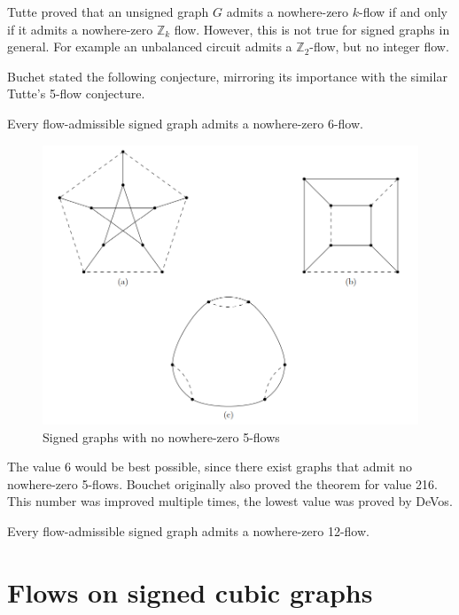 Tutte\cite{tutte-proof} proved that an unsigned graph $G$ admits a nowhere-zero $k$-flow if and only if it admits a nowhere-zero $\mathbb{Z}_k$ flow.
However, this is not true for signed graphs in general. For example an unbalanced circuit admits a $\mathbb{Z}_2$-flow, but no integer flow.

Buchet stated the following conjecture, mirroring its importance with the similar Tutte's 5-flow conjecture.

\begin{conjecture}
    Every flow-admissible signed graph admits a nowhere-zero 6-flow.
\end{conjecture}

\begin{figure}[ht]\label{fig:no-5-flow}
    \centering
    \includegraphics[scale=0.65]{images/petersen-no-5.png}
    \caption{Signed graphs with no nowhere-zero 5-flows}
\end{figure}

The value 6 would be best possible, since there exist graphs that admit no nowhere-zero 5-flows.
Bouchet originally also proved the theorem for value 216. This number was improved multiple times,
the lowest value was proved by DeVos\cite{devos}.

\begin{theorem}[DeVos]
    Every flow-admissible signed graph admits a nowhere-zero 12-flow.
\end{theorem}

\section{Flows on signed cubic graphs}

